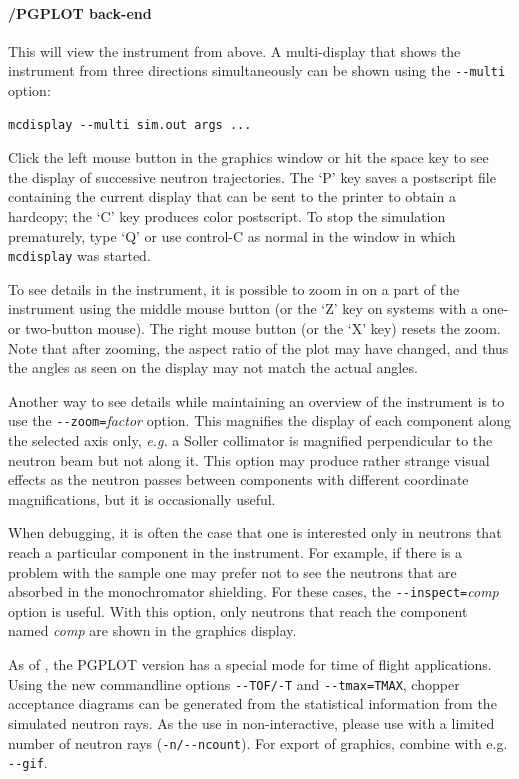 \paragraph{\MCS /PGPLOT back-end}

This will view the instrument from above. A multi-display that shows the
instrument from three directions simultaneously can be shown using the
\verb+--multi+ option:
\begin{lstlisting}
mcdisplay --multi sim.out args ...
\end{lstlisting}

Click the left mouse button in the graphics window or hit the space key to see
the display of successive neutron trajectories. The `P' key saves a postscript
file containing the current display that can be sent to the printer to obtain a
hardcopy; the `C' key produces color postscript.  To stop the simulation
prematurely, type `Q' or use control-C as normal in the window in which
\verb+mcdisplay+ was started.

To see details in the instrument, it is possible to zoom in on a part of the
instrument using the middle mouse button (or the `Z' key on systems with a one-
or two-button mouse). The right mouse button (or the `X' key) resets the
zoom. Note that after zooming, the aspect ratio of the plot may have changed,
and thus the angles as seen on the display may not match the actual angles.

Another way to see details while maintaining an overview of the instrument is to
use the \verb+--zoom=+\textit{factor} option. This magnifies the display of each
component along the selected axis only, {\em e.g.} a Soller collimator is
magnified perpendicular to the neutron beam but not along it. This option may
produce rather strange visual effects as the neutron passes between components
with different coordinate magnifications, but it is occasionally useful.

When debugging, it is often the case that one is interested only in neutrons
that reach a particular component in the instrument. For example, if there is a
problem with the sample one may prefer not to see the neutrons that are absorbed
in the monochromator shielding. For these cases, the
\verb+--inspect=+\textit{comp\/} option is useful. With this option, only
neutrons that reach the component named \textit{comp\/} are shown in the
graphics display.

As of , the PGPLOT version has a special mode for time of flight
applications. Using the new commandline options \verb+--TOF/-T+ and
\verb+--tmax=TMAX+, chopper acceptance diagrams can be generated from the
statistical information from the simulated neutron rays. As the use in
non-interactive, please use with a limited number of neutron rays
(\verb+-n/--ncount+). For export of graphics, combine with e.g. \verb+--gif+.

